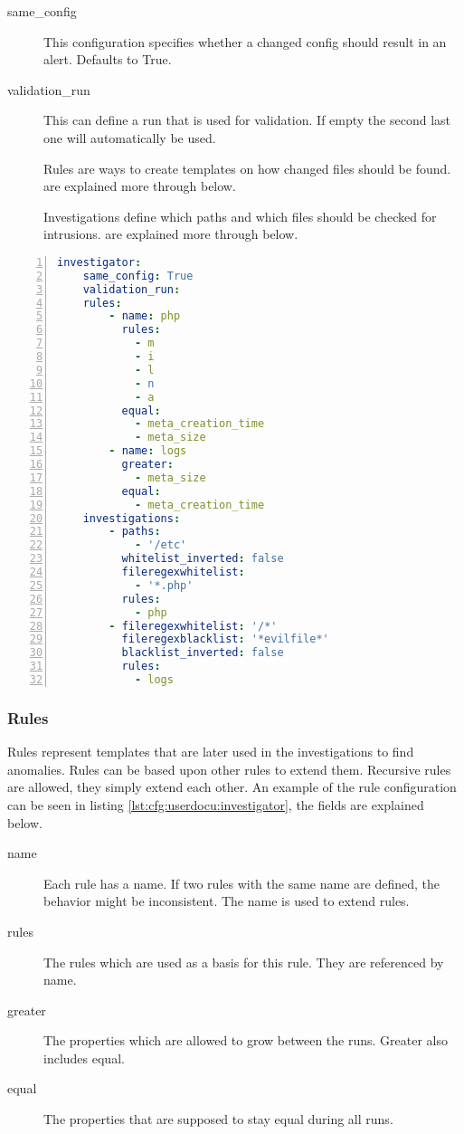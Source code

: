 \begin{description}
    \item [same\_config] This configuration specifies whether a changed config should result in an alert. Defaults to True.
    \item [validation\_run] This can define a run that is used for validation. If empty the second last one will automatically be used.
    \item [] Rules are ways to create templates on how changed files should be found.  are explained more through below.
    \item [] Investigations define which paths and which files should be checked for intrusions.  are explained more through below.
\end{description}

\begin{lstlisting}[language=yaml, numbers=left, caption=Investigator Configuration, label=lst:cfg:userdocu:investigator]
investigator:
	same_config: True
	validation_run: 
	rules: 
		- name: php
		  rules: 
			- m
			- i
			- l
			- n
			- a
		  equal:
			- meta_creation_time
			- meta_size
		- name: logs
		  greater:
			- meta_size
		  equal:
			- meta_creation_time
	investigations:
		- paths:
			- '/etc'
		  whitelist_inverted: false
		  fileregexwhitelist:
			- '*.php'
		  rules:
			- php
		- fileregexwhitelist: '/*'
		  fileregexblacklist: '*evilfile*'
		  blacklist_inverted: false
		  rules:
			- logs
\end{lstlisting}

\subsubsection{Rules}
\label{sec:config:userdocu:rules}

Rules represent templates that are later used in the investigations to find anomalies. Rules can be based upon other rules to extend them. Recursive rules are allowed, they simply extend each other. An example of the rule configuration can be seen in listing \ref{lst:cfg:userdocu:investigator}, the fields are explained below.

\begin{description}
	\item [name] Each rule has a name. If two rules with the same name are defined, the behavior might be inconsistent. The name is used to extend rules.
	\item [rules] The rules which are used as a basis for this rule. They are referenced by name.
	\item [greater] The properties which are allowed to grow between the runs. Greater also includes equal.
	\item [equal] The properties that are supposed to stay equal during all runs.
\end{description}

